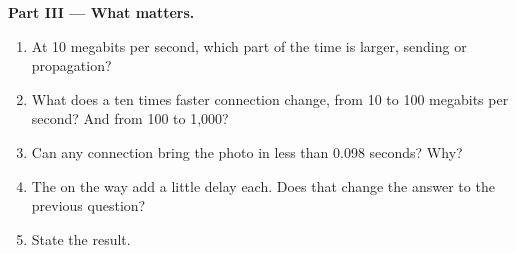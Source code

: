 \begin{problem}
\medskip\noindent\textbf{Part III --- What matters.}
\begin{enumerate}[resume]
  \item At 10 megabits per second, which part of the time is larger, sending
    or propagation?
  \item What does a ten times faster connection change, from 10 to 100
    megabits per second? And from 100 to 1,000?
  \item Can any connection bring the photo in less than 0.098 seconds? Why?
  \item The  on the way add a little delay each. Does that change the
    answer to the previous question?
  \item State the result.
\end{enumerate}
\end{problem}
